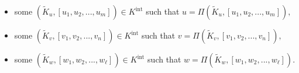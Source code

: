 \documentclass[numbers=enddot,12pt,final,onecolumn,notitlepage]{scrartcl}%
\begin{document}
\begin{itemize}
\item some $\left(  \widetilde{K}_{u},\left[  u_{1},u_{2},...,u_{m}\right]
\right)  \in K^{\operatorname*{int}}$ such that $u=\Pi\left(  \widetilde{K}%
_{u},\left[  u_{1},u_{2},...,u_{m}\right]  \right)  ,$

\item some $\left(  \widetilde{K}_{v},\left[  v_{1},v_{2},...,v_{n}\right]
\right)  \in K^{\operatorname*{int}}$ such that $v=\Pi\left(  \widetilde{K}%
_{v},\left[  v_{1},v_{2},...,v_{n}\right]  \right)  ,$

\item some $\left(  \widetilde{K}_{w},\left[  w_{1},w_{2},...,w_{\ell}\right]
\right)  \in K^{\operatorname*{int}}$ such that $w=\Pi\left(  \widetilde{K}%
_{w},\left[  w_{1},w_{2},...,w_{\ell}\right]  \right)  $.
\end{itemize}
\end{document}
